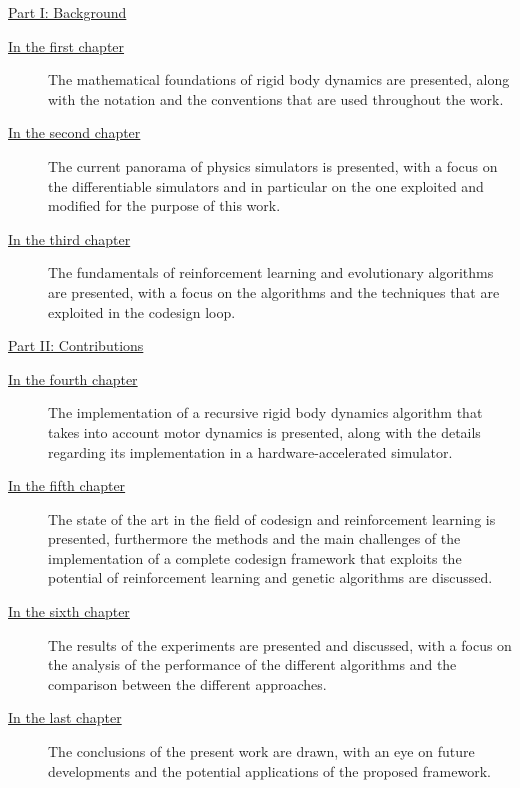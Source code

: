 \begin{description}

    \item{\hyperref[part:background]{Part I: Background}}

          \begin{description}
              \item[{\hyperref[chp:back_RBDynamics]{In the first chapter}}] The mathematical foundations of rigid body dynamics are presented, along with the notation and the conventions that are used throughout the work.
              \item[{\hyperref[chp:back_PhysicsSimulators]{In the second chapter}}] The current panorama of physics simulators is presented, with a focus on the differentiable simulators and in particular on the one exploited and modified for the purpose of this work.
              \item [{\hyperref[chp:back_RLGA]{In the third chapter}}] The fundamentals of reinforcement learning and evolutionary algorithms are presented, with a focus on the algorithms and the techniques that are exploited in the codesign loop.
          \end{description}

    \item{\hyperref[part:contributions]{Part II: Contributions}}

          \begin{description}
              \item[{\hyperref[chp:contrib_ABA]{In the fourth chapter}}] The implementation of a recursive rigid body dynamics algorithm that takes into account motor dynamics is presented, along with the details regarding its implementation in a hardware-accelerated simulator.
              \item[{\hyperref[chp:contrib_CodesignRL]{In the fifth chapter}}] The state of the art in the field of codesign and reinforcement learning is presented, furthermore the methods and the main challenges of the implementation of a complete codesign framework that exploits the potential of reinforcement learning and genetic algorithms are discussed.
              \item[{\hyperref[chp:contrib_ResultsDiscussion]{In the sixth chapter}}] The results of the experiments are presented and discussed, with a focus on the analysis of the performance of the different algorithms and the comparison between the different approaches.
              \item[{\hyperref[chp:contrib_Conclusions]{In the last chapter}}] The conclusions of the present work are drawn, with an eye on future developments and the potential applications of the proposed framework.
          \end{description}
\end{description}
